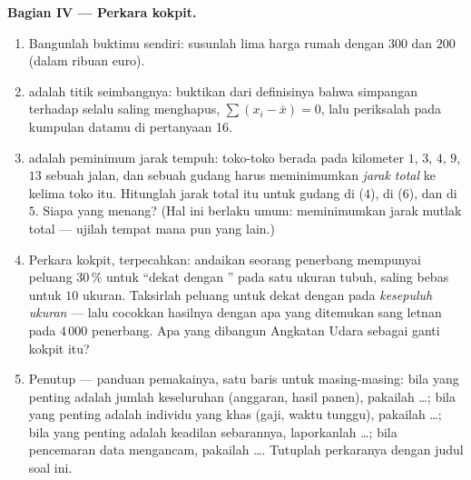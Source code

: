 \begin{problem}
\medskip
\noindent\textbf{Bagian IV --- Perkara kokpit.}
\begin{enumerate}[resume]
  \item Bangunlah buktimu sendiri: susunlah lima harga rumah
        dengan  $300$ dan  $200$ (dalam ribuan euro).
  \item {} adalah titik seimbangnya: buktikan dari definisinya
        bahwa simpangan terhadap  selalu saling menghapus,
        $\sum (x_i - \bar x) = 0$, lalu periksalah pada kumpulan datamu
        di pertanyaan 16.
  \item {} adalah peminimum jarak tempuh: toko-toko berada pada
        kilometer $1$, $3$, $4$, $9$, $13$ sebuah jalan, dan sebuah
        gudang harus meminimumkan \emph{jarak total} ke kelima
        toko itu. Hitunglah jarak total itu untuk gudang di
         ($4$), di  ($6$), dan di $5$. Siapa yang menang?
        (Hal ini berlaku umum:  meminimumkan jarak mutlak total ---
        ujilah tempat mana pun yang lain.)
  \item Perkara kokpit, terpecahkan: andaikan seorang penerbang mempunyai
        peluang $30\,\%$ untuk ``dekat dengan '' pada satu ukuran
        tubuh, saling bebas untuk $10$ ukuran.
        Taksirlah peluang untuk dekat dengan  pada
        \emph{kesepuluh ukuran} --- lalu cocokkan hasilnya dengan apa yang
        ditemukan sang letnan pada $4\,000$ penerbang. Apa yang dibangun
        Angkatan Udara sebagai ganti kokpit  itu?
  \item Penutup --- panduan pemakainya, satu baris untuk masing-masing: bila
        yang penting adalah jumlah keseluruhan (anggaran, hasil panen), pakailah
        \dots; bila yang penting adalah individu yang khas (gaji, waktu
        tunggu), pakailah \dots; bila yang penting adalah keadilan sebarannya,
        laporkanlah \dots; bila pencemaran data mengancam, pakailah
        \dots. Tutuplah perkaranya dengan judul soal ini.

\end{enumerate}
\end{problem}
